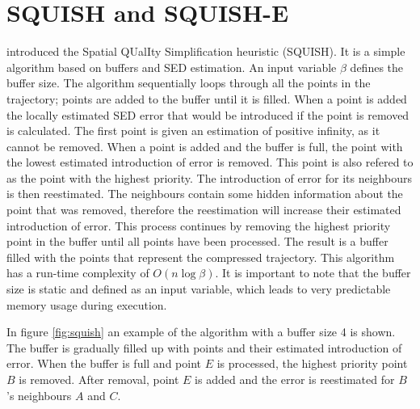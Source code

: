 \section{SQUISH and SQUISH-E}
\cite{muckell2011squish} introduced the Spatial QUalIty Simplification heuristic (SQUISH). It is a simple algorithm based on buffers and SED estimation. An input variable $\beta$ defines the buffer size. The algorithm sequentially loops through all the points in the trajectory; points are added to the buffer until it is filled. When a point is added the locally estimated SED error that would be introduced if the point is removed is calculated. The first point is given an estimation of positive infinity, as it cannot be removed. When a point is added and the buffer is full, the point with the lowest estimated introduction of error is removed. This point is also refered to as the point with the highest priority. The introduction of error for its neighbours is then reestimated. The neighbours contain some hidden information about the point that was removed, therefore the reestimation will increase their estimated introduction of error. This process continues by removing the highest priority point in the buffer until all points have been processed. The result is a buffer filled with the points that represent the compressed trajectory. This algorithm has a run-time complexity of $O(n\log{\beta})$. It is important to note that the buffer size is static and defined as an input variable, which leads to very predictable memory usage during execution.

In figure \ref{fig:squish} an example of the algorithm with a buffer size 4 is shown. The buffer is gradually filled up with points and their estimated introduction of error. When the buffer is full and point $E$ is processed, the highest priority point $B$ is removed. After removal, point $E$ is added and the error is reestimated for $B$'s neighbours $A$ and $C$.

